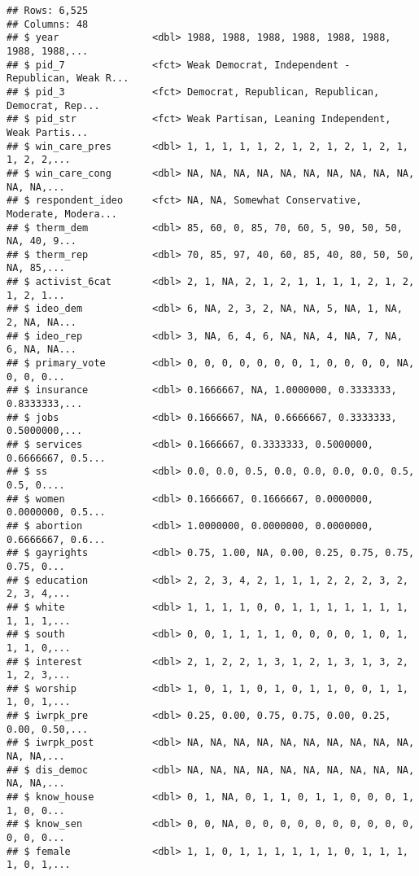 \documentclass[
]{article}
\begin{document}
\begin{verbatim}
## Rows: 6,525
## Columns: 48
## $ year                <dbl> 1988, 1988, 1988, 1988, 1988, 1988, 1988, 1988,...
## $ pid_7               <fct> Weak Democrat, Independent - Republican, Weak R...
## $ pid_3               <fct> Democrat, Republican, Republican, Democrat, Rep...
## $ pid_str             <fct> Weak Partisan, Leaning Independent, Weak Partis...
## $ win_care_pres       <dbl> 1, 1, 1, 1, 1, 2, 1, 2, 1, 2, 1, 2, 1, 1, 2, 2,...
## $ win_care_cong       <dbl> NA, NA, NA, NA, NA, NA, NA, NA, NA, NA, NA, NA,...
## $ respondent_ideo     <fct> NA, NA, Somewhat Conservative, Moderate, Modera...
## $ therm_dem           <dbl> 85, 60, 0, 85, 70, 60, 5, 90, 50, 50, NA, 40, 9...
## $ therm_rep           <dbl> 70, 85, 97, 40, 60, 85, 40, 80, 50, 50, NA, 85,...
## $ activist_6cat       <dbl> 2, 1, NA, 2, 1, 2, 1, 1, 1, 1, 2, 1, 2, 1, 2, 1...
## $ ideo_dem            <dbl> 6, NA, 2, 3, 2, NA, NA, 5, NA, 1, NA, 2, NA, NA...
## $ ideo_rep            <dbl> 3, NA, 6, 4, 6, NA, NA, 4, NA, 7, NA, 6, NA, NA...
## $ primary_vote        <dbl> 0, 0, 0, 0, 0, 0, 0, 1, 0, 0, 0, 0, NA, 0, 0, 0...
## $ insurance           <dbl> 0.1666667, NA, 1.0000000, 0.3333333, 0.8333333,...
## $ jobs                <dbl> 0.1666667, NA, 0.6666667, 0.3333333, 0.5000000,...
## $ services            <dbl> 0.1666667, 0.3333333, 0.5000000, 0.6666667, 0.5...
## $ ss                  <dbl> 0.0, 0.0, 0.5, 0.0, 0.0, 0.0, 0.0, 0.5, 0.5, 0....
## $ women               <dbl> 0.1666667, 0.1666667, 0.0000000, 0.0000000, 0.5...
## $ abortion            <dbl> 1.0000000, 0.0000000, 0.0000000, 0.6666667, 0.6...
## $ gayrights           <dbl> 0.75, 1.00, NA, 0.00, 0.25, 0.75, 0.75, 0.75, 0...
## $ education           <dbl> 2, 2, 3, 4, 2, 1, 1, 1, 2, 2, 2, 3, 2, 2, 3, 4,...
## $ white               <dbl> 1, 1, 1, 1, 0, 0, 1, 1, 1, 1, 1, 1, 1, 1, 1, 1,...
## $ south               <dbl> 0, 0, 1, 1, 1, 1, 0, 0, 0, 0, 1, 0, 1, 1, 1, 0,...
## $ interest            <dbl> 2, 1, 2, 2, 1, 3, 1, 2, 1, 3, 1, 3, 2, 1, 2, 3,...
## $ worship             <dbl> 1, 0, 1, 1, 0, 1, 0, 1, 1, 0, 0, 1, 1, 1, 0, 1,...
## $ iwrpk_pre           <dbl> 0.25, 0.00, 0.75, 0.75, 0.00, 0.25, 0.00, 0.50,...
## $ iwrpk_post          <dbl> NA, NA, NA, NA, NA, NA, NA, NA, NA, NA, NA, NA,...
## $ dis_democ           <dbl> NA, NA, NA, NA, NA, NA, NA, NA, NA, NA, NA, NA,...
## $ know_house          <dbl> 0, 1, NA, 0, 1, 1, 0, 1, 1, 0, 0, 0, 1, 1, 0, 0...
## $ know_sen            <dbl> 0, 0, NA, 0, 0, 0, 0, 0, 0, 0, 0, 0, 0, 0, 0, 0...
## $ female              <dbl> 1, 1, 0, 1, 1, 1, 1, 1, 1, 0, 1, 1, 1, 1, 0, 1,...

\end{verbatim}
\end{document}
